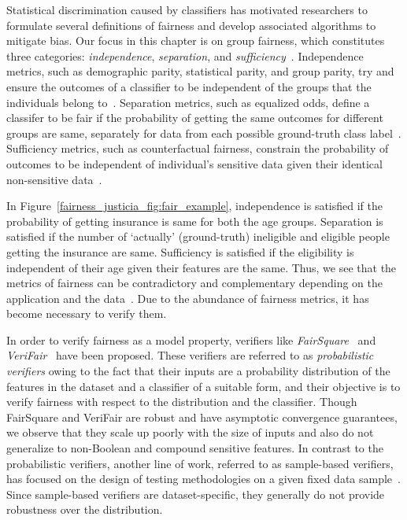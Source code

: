 Statistical discrimination caused by classifiers has motivated researchers to formulate several definitions of fairness and develop associated algorithms to mitigate bias. Our focus in this chapter is on group fairness, which constitutes three categories: \textit{independence}, \textit{separation}, and \textit{sufficiency}~\cite{mehrabi2019survey}. Independence metrics, such as demographic parity, statistical parity, and group parity, try and ensure the outcomes of a classifier to be independent of the groups that the individuals belong to~\cite{feldman2015certifying,dwork2012fairness}. Separation metrics, such as equalized odds, define a classifer to be fair if the probability of getting the same outcomes for different groups are same, separately for data from each possible ground-truth class label~\cite{hardt2016equality}. Sufficiency metrics, such as counterfactual fairness, constrain the probability of outcomes to be independent of individual's sensitive data given their identical non-sensitive data~\cite{kusner2017counterfactual}.

In Figure~\ref{fairness_justicia_fig:fair_example}, independence is satisfied if the probability of getting insurance is same for both the age groups. Separation is satisfied if the number of `actually' (ground-truth) ineligible and eligible people getting the insurance are same. Sufficiency is satisfied if the eligibility is independent of their age given their features are the same. Thus, we see that the metrics of fairness can be contradictory and complementary depending on the application and the data~\cite{corbett2018measure}.
Due to the abundance of fairness metrics, it has become necessary to verify them.

In order to verify fairness as a model property, verifiers like \textit{FairSquare}~\cite{albarghouthi2017fairsquare} and \textit{VeriFair}~\cite{bastani2019probabilistic} have been proposed. 
These verifiers are referred to as {\em probabilistic verifiers} owing to the fact that their inputs are a probability  distribution of the features in the dataset and a classifier of a suitable form, and their objective is to verify fairness with respect to the distribution and the classifier.
Though FairSquare and VeriFair are robust and have asymptotic convergence guarantees, we observe that they scale up poorly with the size of inputs and also do not generalize to non-Boolean and compound sensitive features.
In contrast to the probabilistic verifiers, another line of work, referred to as sample-based verifiers, has focused on the design of testing methodologies  on a given fixed data sample~\cite{galhotra2017fairness,aif360-oct-2018}. 
Since sample-based verifiers are dataset-specific, they generally do not provide robustness over the distribution.


